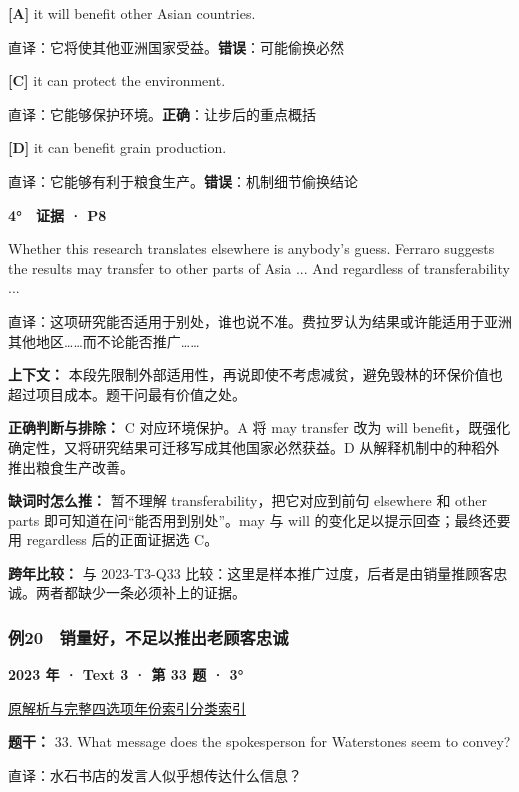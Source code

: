 \documentclass[11pt,a4paper]{article}
\begin{document}
\noindent\textbf{[A]} it will benefit other Asian countries.\par\nopagebreak
\noindent 直译：它将使其他亚洲国家受益。\quad\textbf{错误}：可能偷换必然\par\smallskip
{}\noindent\textbf{[C]} it can protect the environment.\par\nopagebreak
\noindent 直译：它能够保护环境。\quad\textbf{正确}：让步后的重点概括\par\smallskip
{}\noindent\textbf{[D]} it can benefit grain production.\par\nopagebreak
\noindent 直译：它能够有利于粮食生产。\quad\textbf{错误}：机制细节偷换结论\par\smallskip
\begin{evidence}\textbf{4°　证据 · P8}\par Whether this research translates elsewhere is anybody’s guess. Ferraro suggests the results may transfer to other parts of Asia ... And regardless of transferability ...\par 直译：这项研究能否适用于别处，谁也说不准。费拉罗认为结果或许能适用于亚洲其他地区……而不论能否推广……\end{evidence}
\noindent\textbf{上下文：} 本段先限制外部适用性，再说即使不考虑减贫，避免毁林的环保价值也超过项目成本。题干问最有价值之处。\par\smallskip
\noindent\textbf{正确判断与排除：} C 对应环境保护。A 将 may transfer 改为 will benefit，既强化确定性，又将研究结果可迁移写成其他国家必然获益。D 从解释机制中的种稻外推出粮食生产改善。\par\smallskip
\noindent\textbf{缺词时怎么推：} 暂不理解 transferability，把它对应到前句 elsewhere 和 other parts 即可知道在问“能否用到别处”。may 与 will 的变化足以提示回查；最终还要用 regardless 后的正面证据选 C。\par\smallskip
\noindent\textbf{跨年比较：} 与 2023-T3-Q33 比较：这里是样本推广过度，后者是由销量推顾客忠诚。两者都缺少一条必须补上的证据。\par\smallskip
\clearpage
\subsubsection{例20　销量好，不足以推出老顾客忠诚}\label{case-2023-T3-Q33}
\noindent\textbf{2023 年 · Text 3 · 第 33 题 · 3°}\par\noindent \href{https://zj139.github.io/math-notes/english/0b41d98590bdcf819b5d5556/\#q33}{原解析与完整四选项}\quad \hyperref[idx-2023-T3-Q33]{年份索引}\quad \hyperref[class-R09]{分类索引}\par\smallskip
\noindent\textbf{题干：} 33. What message does the spokesperson for Waterstones seem to convey?\par\smallskip
直译：水石书店的发言人似乎想传达什么信息？
\end{document}

